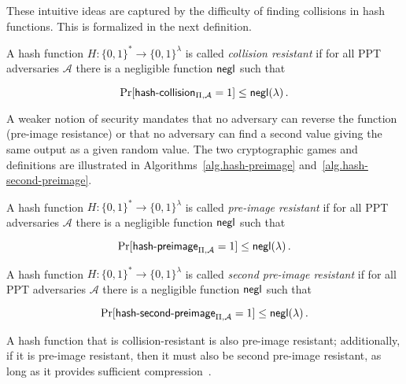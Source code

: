 These intuitive ideas are captured by the difficulty of finding
collisions in hash functions. This is formalized in the next definition.



\begin{definition}
  A hash function $H: \{0, 1\}^* \longrightarrow \{0, 1\}^\lambda$ is called
  \emph{collision resistant} if for all PPT adversaries $\mathcal{A}$ there is a
  negligible function $\mathsf{negl}$ such that

  \[
  \Pr[\textsf{hash-collision}_{\Pi,\mathcal{A}} = 1] \leq \mathsf{negl}(\lambda)\,.
  \]
\end{definition}

A weaker notion of security mandates that no adversary can reverse the function (pre-image resistance) or that no adversary can find a second value giving the same output as a given random value. The two cryptographic games and definitions are illustrated in Algorithms~\ref{alg.hash-preimage} and~\ref{alg.hash-second-preimage}.




\begin{definition}
  A hash function $H: \{0, 1\}^* \longrightarrow \{0, 1\}^\lambda$ is called
  \emph{pre-image resistant} if for all PPT adversaries $\mathcal{A}$ there is a
  negligible function $\mathsf{negl}$ such that

  \[
  \Pr[\textsf{hash-preimage}_{\Pi,\mathcal{A}} = 1] \leq \mathsf{negl}(\lambda)\,.
  \]
\end{definition}

\begin{definition}
  A hash function $H: \{0, 1\}^* \longrightarrow \{0, 1\}^\lambda$ is called
  \emph{second pre-image resistant} if for all PPT adversaries $\mathcal{A}$
  there is a negligible function $\mathsf{negl}$ such that

  \[
  \Pr[\textsf{hash-second-preimage}_{\Pi,\mathcal{A}} = 1] \leq \mathsf{negl}(\lambda)\,.
  \]
\end{definition}

A hash function that is collision-resistant is also pre-image resistant; additionally, if it is pre-image resistant, then it must also be second pre-image resistant, as long as it provides sufficient compression~\cite{rogaway2004cryptographic}.

